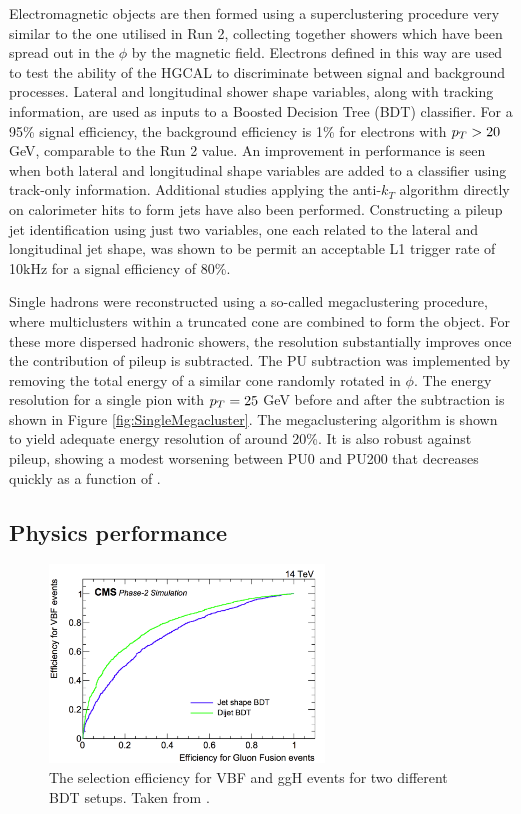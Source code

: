 Electromagnetic objects are then formed using a superclustering procedure very similar to the one utilised in Run 2, 
collecting together showers which have been spread out in the $\phi$ by the magnetic field. 
Electrons defined in this way are used to test the ability of the HGCAL to discriminate between signal and background processes. 
Lateral and longitudinal shower shape variables, along with tracking information, are used as inputs to a Boosted Decision Tree (BDT) classifier. 
For a 95\% signal efficiency, the background efficiency is 1\% for electrons with $p_T > 20$ GeV, comparable to the Run 2 value. 
An improvement in performance is seen when both lateral and longitudinal shape variables are added to a classifier using track-only information. 
Additional studies applying the anti-$k_T$ algorithm directly on calorimeter hits to form jets have also been performed.
Constructing a pileup jet identification using just two variables, one each related to the lateral and longitudinal jet shape, 
was shown to be permit an acceptable L1 trigger rate of 10kHz for a signal efficiency of 80\%. 

Single hadrons were reconstructed using a so-called megaclustering procedure, where multiclusters within a truncated cone are combined to form the object. 
For these more dispersed hadronic showers, the resolution substantially improves once the contribution of pileup is subtracted.
The PU subtraction was implemented by removing the total energy of a similar cone randomly rotated in $\phi$. 
The energy resolution for a single pion with $p_T = 25$ GeV before and after the subtraction is shown in Figure \ref{fig:SingleMegacluster}. 
The megaclustering algorithm is shown to yield adequate energy resolution of around 20\%. 
It is also robust against pileup, showing a modest worsening between PU0 and PU200 that decreases quickly as a function of \pt.

\subsection{Physics performance}

\begin{figure}[h!]
\begin{centering}
\includegraphics[width=0.65\textwidth]{Figures/HGCAL/VBFvsGGH.png}
\caption{The selection efficiency for VBF and ggH events for two different BDT setups. Taken from \cite{HGCAL}.}
\label{fig:VBFvsGGH}
\end{centering}
\end{figure}

